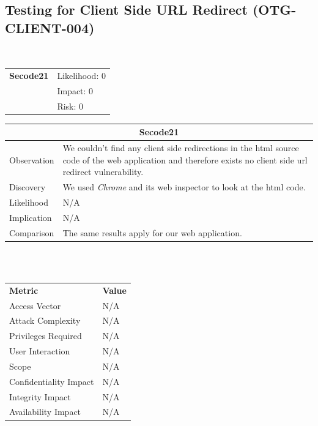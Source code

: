 \documentclass[headsepline,footsepline,footinclude=false,oneside,fontsize=11pt,paper=a4,listof=totoc,bibliography=totoc]{scrbook} %
\begin{document}
\pagebreak


\subsection{Testing for Client Side URL Redirect (OTG-CLIENT-004)}\
\begin{tabular}{cR{12cm}}
	\textbf{Secode21} & Likelihood: 0\\& Impact: 0\\& Risk: 0
\end{tabular}

\begin{tabular}{ l|p{11cm}  }
	\hline
	\multicolumn{2}{c}{\textbf{Secode21}} \\
	\hline
	Observation   & We couldn't find any client side redirections in the html source code of the web application and therefore exists no client side url redirect vulnerability. \\
	Discovery  & We used \textit{Chrome} and its web inspector to look at the html code. \\
	Likelihood & N/A \\
	Implication    & N/A \\
	Comparison & The same results apply for our web application. \\
	\hline
\end{tabular}
\\
\vspace{0.5cm}
\\
\begin{center}
	\begin{tabular}{ll}
		\rowcolor[HTML]{34CDF9}
		{\color[HTML]{ECF4FF} \textbf{Metric}}        & {\color[HTML]{ECF4FF} \textbf{Value}} \\
		\rowcolor[HTML]{BBDAFF}
		{\color[HTML]{333333} Access Vector}          & {\color[HTML]{333333} } N/A              \\
		\rowcolor[HTML]{ECF4FF}
		{\color[HTML]{333333} Attack Complexity}      & {\color[HTML]{333333} } N/A              \\
		\rowcolor[HTML]{BBDAFF}
		{\color[HTML]{333333} Privileges Required}    & {\color[HTML]{333333} } N/A              \\
		\rowcolor[HTML]{ECF4FF}
		{\color[HTML]{333333} User Interaction}       & {\color[HTML]{333333} } N/A              \\
		\rowcolor[HTML]{BBDAFF}
		{\color[HTML]{333333} Scope}                  & {\color[HTML]{333333} } N/A              \\
		\rowcolor[HTML]{ECF4FF}
		{\color[HTML]{333333} Confidentiality Impact} & {\color[HTML]{333333} } N/A              \\
		\rowcolor[HTML]{BBDAFF}
		{\color[HTML]{333333} Integrity Impact}       & {\color[HTML]{333333} } N/A              \\
		\rowcolor[HTML]{ECF4FF}
		{\color[HTML]{333333} Availability Impact}    & {\color[HTML]{333333} } N/A
	\end{tabular}
\end{center}
\pagebreak
\end{document}
